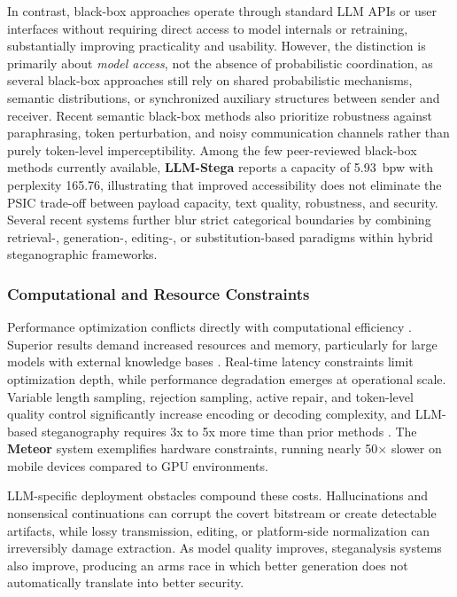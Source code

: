 In contrast, black-box approaches operate through standard LLM APIs or user interfaces without requiring direct access to model internals or retraining, substantially improving practicality and usability. However, the distinction is primarily about \emph{model access}, not the absence of probabilistic coordination, as several black-box approaches still rely on shared probabilistic mechanisms, semantic distributions, or synchronized auxiliary structures between sender and receiver. Recent semantic black-box methods also prioritize robustness against paraphrasing, token perturbation, and noisy communication channels rather than purely token-level imperceptibility. Among the few peer-reviewed black-box methods currently available, \textbf{LLM-Stega} reports a capacity of 5.93~bpw with perplexity 165.76, illustrating that improved accessibility does not eliminate the PSIC trade-off between payload capacity, text quality, robustness, and security. Several recent systems further blur strict categorical boundaries by combining retrieval-, generation-, editing-, or substitution-based paradigms within hybrid steganographic frameworks.


\subsubsection{Computational and Resource Constraints}

Performance optimization conflicts directly with computational efficiency \cite{kaptchuk2021meteor}. Superior results demand increased resources and memory, particularly for large models with external knowledge bases \cite{ding2023discop}. Real-time latency constraints limit optimization depth, while performance degradation emerges at operational scale. Variable length sampling, rejection sampling, active repair, and token-level quality control significantly increase encoding or decoding complexity, and LLM-based steganography requires 3x to 5x more time than prior methods \cite{qi2024provably,wang2025rsstega}. The \textbf{Meteor} system exemplifies hardware constraints, running nearly 50$\times$ slower on mobile devices compared to GPU environments.

LLM-specific deployment obstacles compound these costs. Hallucinations and nonsensical continuations can corrupt the covert bitstream or create detectable artifacts, while lossy transmission, editing, or platform-side normalization can irreversibly damage extraction. As model quality improves, steganalysis systems also improve, producing an arms race in which better generation does not automatically translate into better security.

